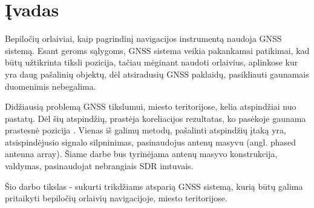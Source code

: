 \documentclass[../gnss_interference_resistant_thesis.tex]{subfiles}
\begin{document}
\section*{Įvadas}

Bepiločių orlaiviai, kaip pagrindinį navigacijos instrumentą naudoja
GNSS sistemą. Esant geroms sąlygoms, GNSS sistema veikia pakankamai
patikimai, kad būtų užtikrinta tiksli pozicija,
tačiau mėginant naudoti orlaivius, aplinkose kur yra daug
pašalinių objektų, dėl atsiradusių GNSS paklaidų, pasikliauti gaunamais
duomenimis nebegalima.

Didžiausią problemą GNSS tikslumui, miesto teritorijose, kelia
atspindžiai nuo pastatų. Dėl šių atspindžių, prastėja
koreliacijos rezultatas, ko pasėkoje gaunama prastesnė
pozicija \cite{Vagle2016}. Vienas iš galimų metodų,
pašalinti atspindžių įtaką yra, atsispindėjusio signalo
silpninimas, pasinaudojus antenų masyvu (angl. phased antenna array).
Šiame darbe bus tyrinėjama antenų masyvo konstrukcija,
valdymas, pasinaudojat nebrangiais SDR imtuvais.

Šio darbo tikslas - sukurti trikdžiams atsparią GNSS sistemą,
kurią būtų galima pritaikyti bepiločių orlaivių navigacijoje, miesto
teritorijose.
\end{document}

